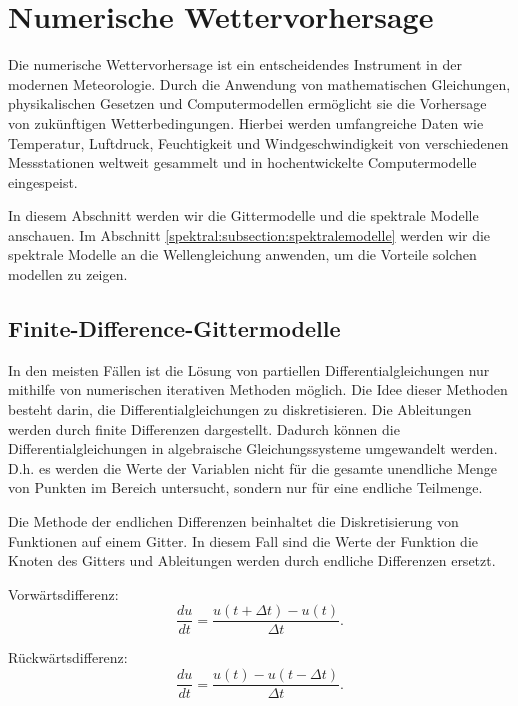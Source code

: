 %
%
%
%
\section{Numerische Wettervorhersage
\label{spektral:section:nwp}}
Die numerische Wettervorhersage ist ein entscheidendes Instrument in der modernen Meteorologie. Durch die Anwendung von mathematischen Gleichungen, physikalischen Gesetzen und Computermodellen ermöglicht sie die Vorhersage von zukünftigen Wetterbedingungen. Hierbei werden umfangreiche Daten wie Temperatur, Luftdruck, Feuchtigkeit und Windgeschwindigkeit von verschiedenen Messstationen weltweit gesammelt und in hochentwickelte Computermodelle eingespeist.

In diesem Abschnitt werden wir die Gittermodelle und die spektrale Modelle anschauen. Im Abschnitt \ref{spektral:subsection:spektralemodelle} werden wir die spektrale Modelle an die Wellengleichung anwenden, um die Vorteile solchen modellen zu zeigen.

\subsection{Finite-Difference-Gittermodelle
\label{spektral:subsection:gittermodelle}}
In den meisten Fällen ist die Lösung von partiellen Differentialgleichungen nur mithilfe von numerischen iterativen Methoden möglich. 
Die Idee dieser Methoden besteht darin, die Differentialgleichungen zu diskretisieren.
Die Ableitungen werden durch finite Differenzen dargestellt.
Dadurch können die Differentialgleichungen in algebraische Gleichungssysteme umgewandelt werden.
D.h. es werden die Werte der Variablen nicht für die gesamte unendliche Menge von Punkten im Bereich untersucht, sondern nur für eine endliche Teilmenge.

Die Methode der endlichen Differenzen beinhaltet die Diskretisierung von Funktionen auf einem Gitter.
In diesem Fall sind die Werte der Funktion die Knoten des Gitters und Ableitungen werden durch endliche Differenzen ersetzt.

Vorwärtsdifferenz:
\begin{equation}
\frac{du}{dt} = \frac{u(t + \Delta{t}) - u(t)}{\Delta{t}}.
\label{spektral:equation1}
\end{equation}

Rückwärtsdifferenz:
\begin{equation}
\frac{du}{dt} = \frac{u(t) - u(t - \Delta{t})}{\Delta{t}}.
\label{spektral:equation2}
\end{equation}

